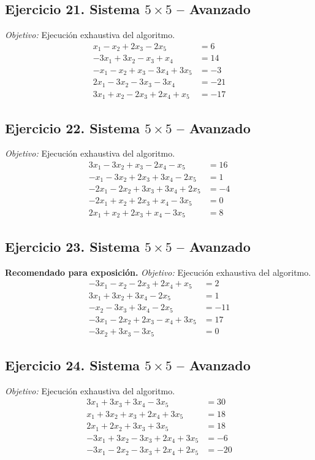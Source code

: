 \documentclass[12pt]{article}
\theoremstyle{remark}
\begin{document}
\subsection*{Ejercicio 21. Sistema $5\times5$ -- Avanzado}
\emph{Objetivo:} Ejecución exhaustiva del algoritmo.
\[
\begin{aligned}
x_{1} - x_{2} + 2 x_{3} - 2 x_{5} &= 6\\
- 3 x_{1} + 3 x_{2} - x_{3} + x_{4} &= 14\\
- x_{1} - x_{2} + x_{3} - 3 x_{4} + 3 x_{5} &= -3\\
2 x_{1} - 3 x_{2} - 3 x_{3} - 3 x_{4} &= -21\\
3 x_{1} + x_{2} - 2 x_{3} + 2 x_{4} + x_{5} &= -17
\end{aligned}
\]
\subsection*{Ejercicio 22. Sistema $5\times5$ -- Avanzado}
\emph{Objetivo:} Ejecución exhaustiva del algoritmo.
\[
\begin{aligned}
3 x_{1} - 3 x_{2} + x_{3} - 2 x_{4} - x_{5} &= 16\\
- x_{1} - 3 x_{2} + 2 x_{3} + 3 x_{4} - 2 x_{5} &= 1\\
- 2 x_{1} - 2 x_{2} + 3 x_{3} + 3 x_{4} + 2 x_{5} &= -4\\
- 2 x_{1} + x_{2} + 2 x_{3} + x_{4} - 3 x_{5} &= 0\\
2 x_{1} + x_{2} + 2 x_{3} + x_{4} - 3 x_{5} &= 8
\end{aligned}
\]
\subsection*{Ejercicio 23. Sistema $5\times5$ -- Avanzado}
\textbf{Recomendado para exposición.} \emph{Objetivo:} Ejecución exhaustiva del algoritmo.
\[
\begin{aligned}
- 3 x_{1} - x_{2} - 2 x_{3} + 2 x_{4} + x_{5} &= 2\\
3 x_{1} + 3 x_{2} + 3 x_{4} - 2 x_{5} &= 1\\
- x_{2} - 3 x_{3} + 3 x_{4} - 2 x_{5} &= -11\\
- 3 x_{1} - 2 x_{2} + 2 x_{3} - x_{4} + 3 x_{5} &= 17\\
- 3 x_{2} + 3 x_{3} - 3 x_{5} &= 0
\end{aligned}
\]
\subsection*{Ejercicio 24. Sistema $5\times5$ -- Avanzado}
\emph{Objetivo:} Ejecución exhaustiva del algoritmo.
\[
\begin{aligned}
3 x_{1} + 3 x_{3} + 3 x_{4} - 3 x_{5} &= 30\\
x_{1} + 3 x_{2} + x_{3} + 2 x_{4} + 3 x_{5} &= 18\\
2 x_{1} + 2 x_{2} + 3 x_{3} + 3 x_{5} &= 18\\
- 3 x_{1} + 3 x_{2} - 3 x_{3} + 2 x_{4} + 3 x_{5} &= -6\\
- 3 x_{1} - 2 x_{2} - 3 x_{3} + 2 x_{4} + 2 x_{5} &= -20
\end{aligned}
\]
\end{document}
